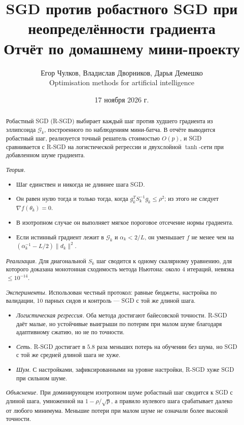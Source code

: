 \documentclass[11pt,a4paper]{article}
\title{SGD против робастного SGD при неопределённости градиента\\[0.3em]
\large Отчёт по домашнему мини-проекту}
\author{Егор Чулков, Владислав Дворников, Дарья Демешко\\[0.2em]\small Optimisation methods for artificial intelligence}
\date{17 ноября 2026 г.}
\newcommand{\G}{\mathcal{G}_k}
\begin{document}
\maketitle

\begin{abstract}
\noindent Робастный SGD (R-SGD) выбирает каждый шаг против худшего градиента из эллипсоида $\G$,
построенного по наблюдениям мини-батча. В отчёте выводится робастный шаг, реализуется точный
решатель стоимостью $O(p)$, и SGD сравнивается с R-SGD на логистической регрессии и двухслойной
$\tanh$-сети при добавленном шуме градиента.

\emph{Теория.}
\begin{itemize}
\item Шаг единствен и никогда не длиннее шага SGD.
\item Он равен нулю тогда и только тогда, когда $g_k^TS_k^{-1}g_k\le\rho^2$; из этого не следует
$\nabla f(\theta_k)=0$.
\item В изотропном случае он выполняет мягкое пороговое отсечение нормы градиента.
\item Если истинный градиент лежит в $\G$ и $\alpha_k<2/L$, он уменьшает $f$ не менее чем на
$(\alpha_k^{-1}-L/2)\|d_k\|^2$.
\end{itemize}

\emph{Реализация.} Для диагональной $S_k$ шаг сводится к одному скалярному уравнению, для которого
доказана монотонная сходимость метода Ньютона: около 4 итераций, невязка $\le10^{-14}$.

\emph{Эксперименты.} Использован честный протокол: равные бюджеты, настройка по валидации, 10
парных сидов и контроль — SGD с той же длиной шага.
\begin{itemize}
\item \emph{Логистическая регрессия.} Оба метода достигают байесовской точности. R-SGD даёт малые,
но устойчивые выигрыши по потерям при малом шуме благодаря адаптивному сжатию, но не по точности.
\item \emph{Сеть.} R-SGD достигает в $5.8$ раза меньших потерь на обучении без шума, но SGD с той же
средней длиной шага не хуже.
\item \emph{Шум.} С настройками, зафиксированными на уровне настройки, R-SGD хуже SGD при сильном
шуме.
\end{itemize}

\emph{Объяснение.} При доминирующем изотропном шуме робастный шаг сводится к SGD с длиной шага,
умноженной на $1-\rho/\sqrt p$, а правило нулевого шага срабатывает далеко от любого минимума.
Меньшие потери при малом шуме не означали более высокой точности.
\end{abstract}
\end{document}
